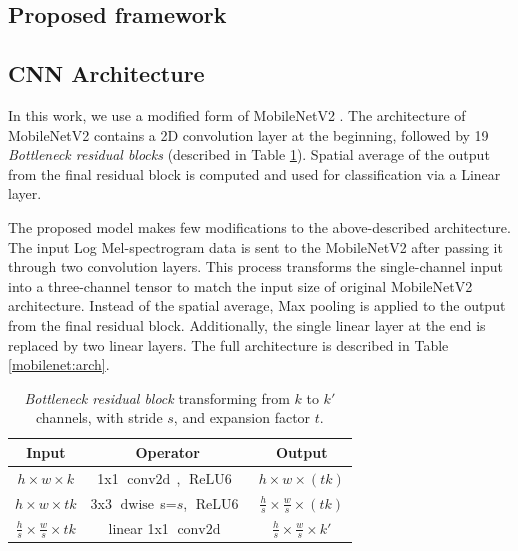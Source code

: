 \documentclass{article}
\def\relus{{\ensuremath{\operatorname{\mathop{ReLU6}\,}}}}
\def\conv{{\ensuremath{\operatorname{\mathop{conv2d}\,}}}}
\def\depthwise{{\ensuremath{\operatorname{\mathop{dwise}\,}}}}
\begin{document}
\begin{sloppy}
\section{Proposed framework}
\label{sec:framework}

\subsection{CNN Architecture}
\label{ssec:architecture}

In this work, we use a modified form of MobileNetV2 \cite{sandler2018mobilenetv2}. The architecture of MobileNetV2 contains a 2D convolution layer at the beginning, followed by 19 \textit{Bottleneck residual blocks} (described in Table \ref{fig:bottlenec_block_table}). Spatial average of the output from the final residual block is computed and used for classification via a Linear layer.

The proposed model makes few modifications to the above-described architecture. The input Log Mel-spectrogram data is sent to the MobileNetV2 after passing it through two convolution layers. This process transforms the single-channel input into a three-channel tensor to match the input size of original MobileNetV2 architecture. Instead of the spatial average, Max pooling is applied to the output from the final residual block. Additionally, the single linear layer at the end is replaced by two linear layers. The full architecture is described in Table \ref{mobilenet:arch}.

\begin{table}
\centering
    \begin{tabular}{c|c|c}
    Input & Operator & Output\\
    \toprule
    $h \times w \times k$ & 1x1 \conv, \relus & $h \times w \times (tk)$\\
    $h \times w \times tk$& 3x3 \depthwise s=$s$, \relus & $\frac{h}{s} \times \frac{w}{s} \times (tk)$\\ 
    $\frac{h}{s} \times \frac{w}{s} \times tk$ & linear 1x1 \conv & $\frac{h}{s} \times \frac{w}{s} \times k'$\\
    \toprule
    \end{tabular}
    \caption{{\em Bottleneck residual block} transforming from $k$ to $k'$ channels, with stride $s$, and expansion factor $t$.}
\label{fig:bottlenec_block_table}
\end{table}


\end{sloppy}
\end{document}
